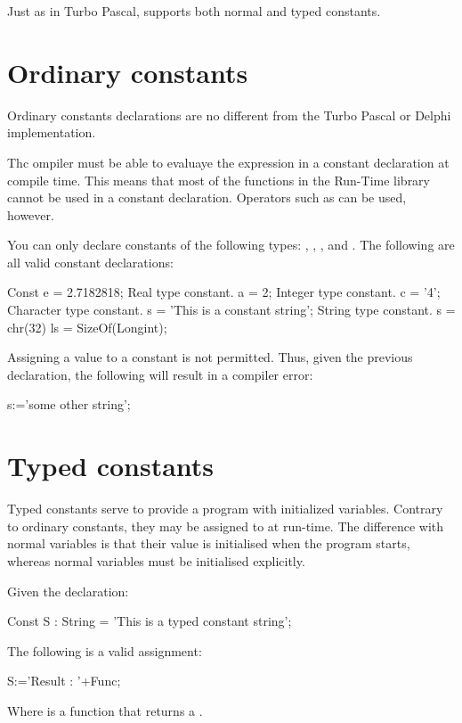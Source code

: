 \documentclass{report}
\begin{document}
Just as in Turbo Pascal, \fpc supports both normal and typed constants.

\section{Ordinary constants}

Ordinary constants declarations are no different from the Turbo Pascal or
Delphi  implementation.

Thc ompiler must be able to evaluaye the expression in a constant
declaration at compile time. This means that most of the functions
in the Run-Time library cannot be used in a constant declaration.
Operators such as  can be used, however.

You can only declare constants of the following types: ,
, , and . 
The following are all valid constant declarations:
\begin{listing}
Const
  e = 2.7182818;  { Real type constant. }
  a = 2;          { Integer type constant. }
  c = '4';        { Character type constant. }
  s = 'This is a constant string'; {String type constant.}
  s = chr(32)
  ls = SizeOf(Longint);
\end{listing}
Assigning a value to a constant is not permitted. Thus, given the previous
declaration, the following will result in a compiler error:
\begin{listing}
  s:='some other string';
\end{listing}

\section{Typed constants}
Typed constants serve to provide a program with initialized variables.
Contrary to ordinary constants, they may be assigned to at run-time.
The difference with normal variables is that their value is initialised
when the program starts, whereas normal variables must be initialised
explicitly.



Given the declaration:
\begin{listing}
Const
  S : String = 'This is a typed constant string';
\end{listing}
The following is a valid assignment:
\begin{listing}
 S:='Result : '+Func;
\end{listing}
Where  is a function that returns a .
\end{document}
